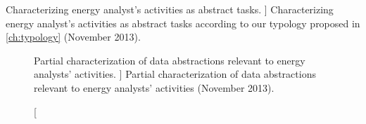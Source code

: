 

\begin{table}
	\centering
	\caption
	[
	    Characterizing energy analyst’s activities as abstract tasks.
	]
	{
    	Characterizing energy analyst's activities as abstract tasks according to our typology proposed in \autoref{ch:typology} (November 2013).  
	}
	\centering
	\label{app:emu:tab:tasks}
\end{table}



\begin{figure}
	\centering
	\caption
	[
	    Partial characterization of data abstractions relevant to energy analysts' activities.
	]
	{
    	Partial characterization of data abstractions relevant to energy analysts' activities (November 2013).  
	}
	\centering
	\label{app:emu:fig:data}
\end{figure}


